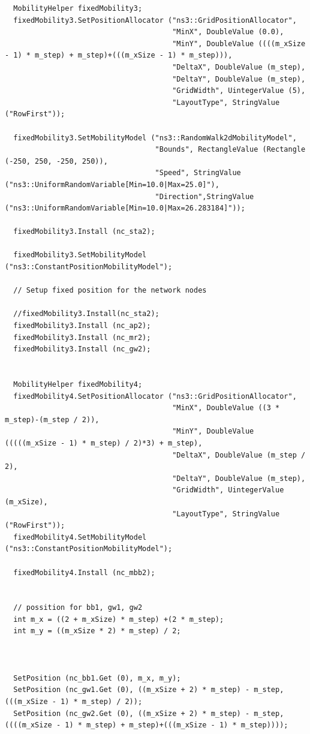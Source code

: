 \documentclass[12pt,a4paper]{report}
\begin{document}
\begin{verbatim}
  MobilityHelper fixedMobility3;
  fixedMobility3.SetPositionAllocator ("ns3::GridPositionAllocator",
                                       "MinX", DoubleValue (0.0),
                                       "MinY", DoubleValue ((((m_xSize - 1) * m_step) + m_step)+(((m_xSize - 1) * m_step))),
                                       "DeltaX", DoubleValue (m_step),
                                       "DeltaY", DoubleValue (m_step),
                                       "GridWidth", UintegerValue (5),
                                       "LayoutType", StringValue ("RowFirst"));

  fixedMobility3.SetMobilityModel ("ns3::RandomWalk2dMobilityModel",
                                   "Bounds", RectangleValue (Rectangle (-250, 250, -250, 250)),
                                   "Speed", StringValue ("ns3::UniformRandomVariable[Min=10.0|Max=25.0]"),
                                   "Direction",StringValue ("ns3::UniformRandomVariable[Min=10.0|Max=26.283184]"));
  
  fixedMobility3.Install (nc_sta2);

  fixedMobility3.SetMobilityModel ("ns3::ConstantPositionMobilityModel");

  // Setup fixed position for the network nodes

  //fixedMobility3.Install(nc_sta2);
  fixedMobility3.Install (nc_ap2);
  fixedMobility3.Install (nc_mr2);
  fixedMobility3.Install (nc_gw2);


  MobilityHelper fixedMobility4;
  fixedMobility4.SetPositionAllocator ("ns3::GridPositionAllocator",
                                       "MinX", DoubleValue ((3 * m_step)-(m_step / 2)),
                                       "MinY", DoubleValue (((((m_xSize - 1) * m_step) / 2)*3) + m_step),
                                       "DeltaX", DoubleValue (m_step / 2),
                                       "DeltaY", DoubleValue (m_step),
                                       "GridWidth", UintegerValue (m_xSize),
                                       "LayoutType", StringValue ("RowFirst"));
  fixedMobility4.SetMobilityModel ("ns3::ConstantPositionMobilityModel");

  fixedMobility4.Install (nc_mbb2);


  // possition for bb1, gw1, gw2
  int m_x = ((2 + m_xSize) * m_step) +(2 * m_step);
  int m_y = ((m_xSize * 2) * m_step) / 2;



  SetPosition (nc_bb1.Get (0), m_x, m_y);
  SetPosition (nc_gw1.Get (0), ((m_xSize + 2) * m_step) - m_step, (((m_xSize - 1) * m_step) / 2));
  SetPosition (nc_gw2.Get (0), ((m_xSize + 2) * m_step) - m_step, ((((m_xSize - 1) * m_step) + m_step)+(((m_xSize - 1) * m_step))));


\end{verbatim}
\end{document}
